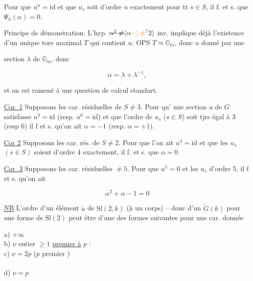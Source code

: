 Pour que  $u^n=\mathrm{id}$ et que $u_s$ soit d'ordre $n$
exactement pour tt $s\in S$, il f. et s. que $\Psi_n(\alpha)=0$.


Principe de démonstration. L'hyp. $\deleted{\alpha^2\ne}\inserted{\alpha\unsure{-|\ne}2}$ inv.
 implique déjà l'existence d'un unique tore maximal
$T$ qui contient $u$. OPS $T\simeq\mathbb G_m$, donc $u$ donné par une

section $\lambda$ de $\mathbb G_m$, donc \deleted{\unsure{$\alpha$|$*$}}

\[
\alpha=\lambda+\lambda^{-1},
\]

et on est ramené à une question de calcul
standart.


\uline{Cor. 1} Supposons les car. résiduelles de $S\ne3$. Pour qu'
une section $u$ de $G$ satisfasse $u^3=\mathrm{id}$ (resp. $u^6=\mathrm{id}$) et que
l'ordre de $u_s$ ($s\in S$) soit tjrs égal à 3 (resp 6) il f et s.
qu'on ait $\alpha=-1$ (resp. $\alpha=+1$).


\uline{Cor 2} Supposons les car. rés. de $S\ne2$. Pour que l'on
ait $u^4=\mathrm{id}$ et que les $u_s$ $(s\in S)$ soient d'ordre 4 exactement,
il f. et s. que $\alpha=0$

\uline{Cor. 3} Supposons les car. résiduelles $\ne5$. Pour que
$u^5=0$ et les $u_s$ d'ordre 5, il f et s. qu'on ait

\[
\alpha^2+\alpha-1=0
\]

\uline{NB} L'ordre \inserted{$\nu$} d'un élément $\tilde u$ de $\mathrm{Sl}(2,k)$ ($k$ un corps)
-- donc d'un $\widetilde G(k)$ pour une forme  de $\mathrm{Sl}(2)$ 
 peut être d'une des formes suivantes 
pour une car. donnée

a) \inserted{$\nu=$} $+\infty$\\ 
b) $\nu$ entier $\geq1$ \uline{premier à} $p$ :\\ 
c) $\nu=2p$ ($p$ premier )\\ 
\\ 
d) $\nu=p$


